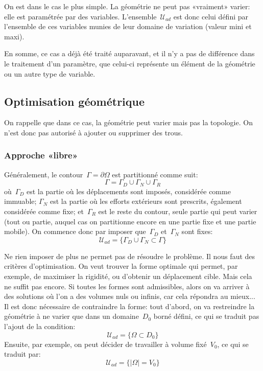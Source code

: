 On est dans le cas le plus simple. La géométrie ne peut pas «vraiment» varier: elle est paramétrée par des variables. L'ensemble~$\mathcal{U}_{ad}$ est donc celui défini par l'ensemble de ces variables munies de leur domaine de variation (valeur mini et maxi).

En somme, ce cas a déjà été traité auparavant, et il n'y a pas de différence dans le traitement d'un paramètre, que celui-ci représente un élément de la géométrie ou un autre type de variable.

\medskip
\subsection{Optimisation géométrique}

On rappelle que dans ce cas, la géométrie peut varier mais pas la topologie. On n'est donc pas autorisé à ajouter ou supprimer des trous.

\medskip
\subsubsection{Approche «libre»}

Généralement, le contour~$\Gamma=\partial\Omega$ est partitionné comme suit:
\begin{equation}
\Gamma = \Gamma_D \cup \Gamma_N \cup \Gamma_R
\end{equation}
où~$\Gamma_D$ est la partie où les déplacements sont imposés, considérée comme immuable; $\Gamma_N$ est la partie où les efforts extérieurs sont prescrits, également considérée comme fixe; et~$\Gamma_R$ est le reste du contour, seule partie qui peut varier (tout ou partie, auquel cas on partitionne encore en une partie fixe et une partie mobile).
On commence donc par imposer que~$\Gamma_D$ et~$\Gamma_N$ sont fixes:
\begin{equation}
\mathcal{U}_{ad}=\{ \Gamma_D \cup \Gamma_N \subset \Gamma\}
\end{equation}

Ne rien imposer de plus ne permet pas de résoudre le problème. Il nous faut des critères d'optimisation.
On veut trouver la forme optimale qui permet, par exemple, de maximiser la rigidité, ou d'obtenir un déplacement cible.
Mais cela ne suffit pas encore. Si toutes les formes sont admissibles, alors on va arriver à des solutions où l'on a des volumes nuls ou infinis, car cela répondra au mieux...
Il est donc nécessaire de contraindre la forme: 
tout d'abord, on va restreindre la géométrie à ne varier que dans un domaine~$D_0$ borné défini, ce qui se traduit pas l'ajout de la condition:
\begin{equation}
\mathcal{U}_{ad}=\{ \Omega\subset D_0 \}
\end{equation}
Ensuite, par exemple, on peut décider de travailler à volume fixé~$V_0$, ce qui se traduit par:
\begin{equation}
\mathcal{U}_{ad}=\{ |\Omega|=V_0\}
\end{equation}

